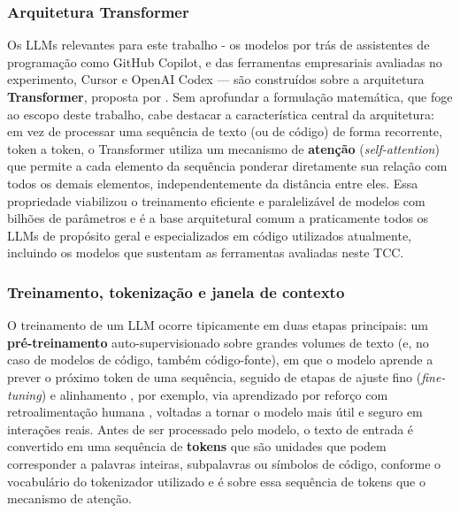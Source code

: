 \subsubsection{Arquitetura Transformer}\label{subsubsec:transformer}
Os LLMs relevantes para este trabalho - os modelos por trás de assistentes de programação como GitHub Copilot, e das ferramentas empresariais avaliadas no experimento, Cursor e OpenAI Codex — são construídos sobre a arquitetura \textbf{Transformer}, proposta por . Sem aprofundar a formulação matemática, que foge ao escopo deste trabalho, cabe destacar a característica central da arquitetura: em vez de processar uma sequência de texto (ou de código) de forma recorrente, token a token, o Transformer utiliza um mecanismo de \textbf{atenção} (\textit{self-attention}) que permite a cada elemento da sequência ponderar diretamente sua relação com todos os demais elementos, independentemente da distância entre eles. Essa propriedade viabilizou o treinamento eficiente e paralelizável de modelos com bilhões de parâmetros e é a base arquitetural comum a praticamente todos os LLMs de propósito geral e especializados em código utilizados atualmente, incluindo os modelos que sustentam as ferramentas avaliadas neste TCC.

\subsubsection{Treinamento, tokenização e janela de contexto}\label{subsubsec:tokenizacao-contexto}
O treinamento de um LLM ocorre tipicamente em duas etapas principais: um \textbf{pré-treinamento} auto-supervisionado sobre grandes volumes de texto (e, no caso de modelos de código, também código-fonte), em que o modelo aprende a prever o próximo token de uma sequência, seguido de etapas de ajuste fino (\textit{fine-tuning}) e alinhamento , por exemplo, via aprendizado por reforço com retroalimentação humana , voltadas a tornar o modelo mais útil e seguro em interações reais. Antes de ser processado pelo modelo, o texto de entrada é convertido em uma sequência de \textbf{tokens} que são unidades que podem corresponder a palavras inteiras, subpalavras ou símbolos de código, conforme o vocabulário do tokenizador utilizado e é sobre essa sequência de tokens que o mecanismo de atenção.

